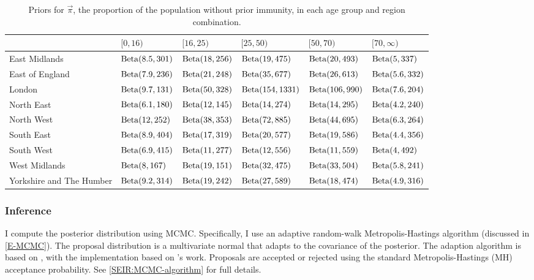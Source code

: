 \documentclass[thesis.tex]{subfiles}
\begin{document}
\begin{landscape}
\begin{table}
\centering
\begin{tabular}{l|lllll}
         & $[0,16)$ & $[16,25)$ & $[25,50)$ & $[50,70)$ & $[70,\infty)$ \\
        \hline
        East Midlands & $\operatorname{Beta}(8.5, 301)$ & $\operatorname{Beta}(18, 256)$ & $\operatorname{Beta}(19, 475)$ & $\operatorname{Beta}(20, 493)$ & $\operatorname{Beta}(5, 337)$ \\
        East of England & $\operatorname{Beta}(7.9, 236)$ & $\operatorname{Beta}(21, 248)$ & $\operatorname{Beta}(35, 677)$ & $\operatorname{Beta}(26, 613)$ & $\operatorname{Beta}(5.6, 332)$ \\
        London & $\operatorname{Beta}(9.7, 131)$ & $\operatorname{Beta}(50, 328)$ & $\operatorname{Beta}(154, 1331)$ & $\operatorname{Beta}(106, 990)$ & $\operatorname{Beta}(7.6, 204)$ \\
        North East & $\operatorname{Beta}(6.1, 180)$ & $\operatorname{Beta}(12, 145)$ & $\operatorname{Beta}(14, 274)$ & $\operatorname{Beta}(14, 295)$ & $\operatorname{Beta}(4.2, 240)$ \\
        North West & $\operatorname{Beta}(12, 252)$ & $\operatorname{Beta}(38, 353)$ & $\operatorname{Beta}(72, 885)$ & $\operatorname{Beta}(44, 695)$ & $\operatorname{Beta}(6.3, 264)$ \\
        South East & $\operatorname{Beta}(8.9, 404)$ & $\operatorname{Beta}(17, 319)$ & $\operatorname{Beta}(20, 577)$ & $\operatorname{Beta}(19, 586)$ & $\operatorname{Beta}(4.4, 356)$ \\
        South West & $\operatorname{Beta}(6.9, 415)$ & $\operatorname{Beta}(11, 277)$ & $\operatorname{Beta}(12, 556)$ & $\operatorname{Beta}(11, 559)$ & $\operatorname{Beta}(4, 492)$ \\
        West Midlands & $\operatorname{Beta}(8, 167)$ & $\operatorname{Beta}(19, 151)$ & $\operatorname{Beta}(32, 475)$ & $\operatorname{Beta}(33, 504)$ & $\operatorname{Beta}(5.8, 241)$ \\
        Yorkshire and The Humber & $\operatorname{Beta}(9.2, 314)$ & $\operatorname{Beta}(19, 242)$ & $\operatorname{Beta}(27, 589)$ & $\operatorname{Beta}(18, 474)$ & $\operatorname{Beta}(4.9, 316)$ \\
    \end{tabular}
\caption{Priors for $\vec{\pi}$, the proportion of the population without prior immunity, in each age group and region combination.}
\label{SEIR:table:immunity-prior}
\end{table}
\end{landscape}

\subsubsection{Inference} \label{SEIR:sec:inference}

I compute the posterior distribution using MCMC.
Specifically, I use an adaptive random-walk Metropolis-Hastings algorithm (discussed in \cref{E-MCMC}).
The proposal distribution is a multivariate normal that adapts to the covariance of the posterior.
The adaption algorithm is based on \textcite[algorithm 4]{andrieuTutorial}, with the implementation based on \textcite{ghoshApproximate}'s work.
Proposals are accepted or rejected using the standard Metropolis-Hastings (MH) acceptance probability.
See \cref{SEIR:MCMC-algorithm} for full details.
\end{document}
